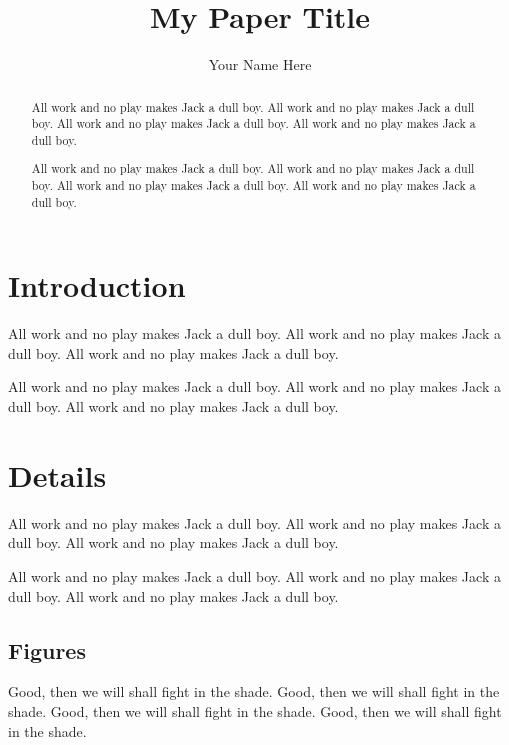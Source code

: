 \documentclass[twocolumn]{article}
\title{\LARGE \bf My Paper Title}
\author{Your Name Here}
\begin{document}
\maketitle

\begin{abstract}

All work and no play makes Jack a dull boy.
All work and no play makes Jack a dull boy.
All work and no play makes Jack a dull boy.
All work and no play makes Jack a dull boy.

All work and no play makes Jack a dull boy.
All work and no play makes Jack a dull boy.
All work and no play makes Jack a dull boy.
All work and no play makes Jack a dull boy.

\end{abstract}

\section{Introduction}
\label{sec:introduction}

All work and no play makes Jack a dull boy.
All work and no play makes Jack a dull boy.
\cite{knuthwebsite}
All work and no play makes Jack a dull boy.

All work and no play makes Jack a dull boy.
All work and no play makes Jack a dull boy.
All work and no play makes Jack a dull boy.

\section{Details}
\label{sec:details}

All work and no play makes Jack a dull boy.
All work and no play makes Jack a dull boy.
All work and no play makes Jack a dull boy.

All work and no play makes Jack a dull boy.
All work and no play makes Jack a dull boy.
All work and no play makes Jack a dull boy.

\subsection{Figures}
\label{sec:details_figures}

Good, then we will shall fight in the shade.
Good, then we will shall fight in the shade.
Good, then we will shall fight in the shade.
Good, then we will shall fight in the shade.
\end{document}
